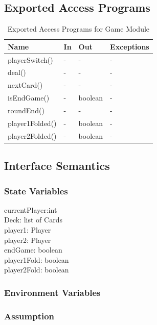 \documentclass[11pt]{article}
\begin{document}
    \subsection{Exported Access Programs}
    \begin{table}[h]
    \caption{Exported Access Programs for Game Module}
    \begin{tabular}{p{4cm}p{2cm}p{2cm}p{4cm}}
    Name & In & Out & Exceptions\\
    \hline
    playerSwitch() & - & - & -\\
    \hline
    deal() & - & - & -\\
    \hline
    nextCard() & - & - & -\\
    \hline
    isEndGame() & - & boolean & -\\
    \hline
    roundEnd() & - & - & - \\
    \hline
    player1Folded() & - & boolean & - \\
    \hline
    player2Folded() & - & boolean & - \\
    
    \end{tabular}
    \end{table}
    \subsection{Interface Semantics}
    \subsubsection{State Variables}
    currentPlayer:int\\
    Deck: list of Cards\\
    player1: Player\\
    player2: Player\\
    endGame: boolean\\
    player1Fold: boolean\\
    player2Fold: boolean
    \subsubsection{Environment Variables}
    \subsubsection{Assumption}
\end{document}

